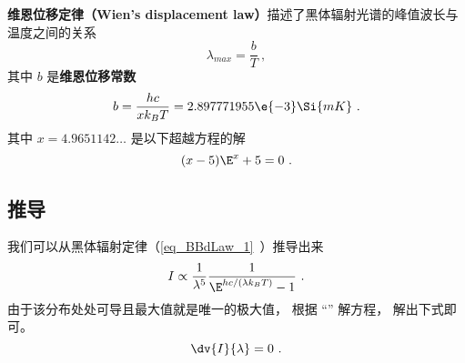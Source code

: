 

\textbf{维恩位移定律（Wien's displacement law）}描述了黑体辐射光谱的峰值波长与温度之间的关系
\begin{equation}
\lambda_{max} = \frac{b}{T}~,
\end{equation}
其中 $b$ 是\textbf{维恩位移常数}
\begin{equation}
b = \frac{hc}{xk_B T} = 2.897771955\e{-3} \Si{mK}~.
\end{equation}
其中 $x = 4.9651142\dots$ 是以下超越方程的解
\begin{equation}
(x-5)\E^x + 5 = 0~.
\end{equation}

\subsection{推导}

我们可以从黑体辐射定律（\autoref{eq_BBdLaw_1}~）推导出来
\begin{equation}
I \propto \frac{1}{\lambda^5} \frac{1}{\E^{hc/(\lambda k_B T)} - 1}~.
\end{equation}
由于该分布处处可导且最大值就是唯一的极大值， 根据 “” 解方程， 解出下式即可。
\begin{equation}
\dv{I}{\lambda} = 0~.
\end{equation}
